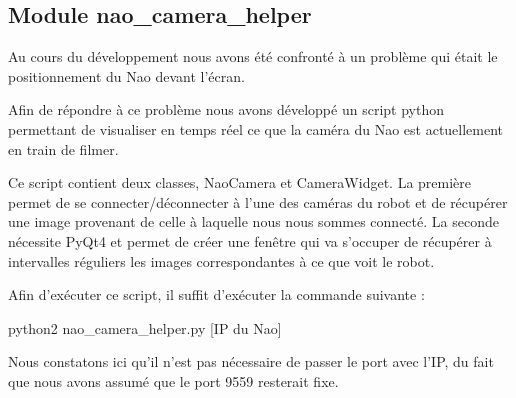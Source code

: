 \subsection{Module nao\_camera\_helper}
\label{sub:Module nao_camera_helper}
	\par Au cours du développement nous avons été confronté à un problème qui était
le positionnement du Nao devant l'écran.
	\par Afin de répondre à ce problème nous avons développé un
script python permettant de visualiser en temps réel ce que la caméra du Nao est
actuellement en train de filmer.
	\par Ce script contient deux classes, NaoCamera et CameraWidget. La première
permet de se connecter/déconnecter à l'une des caméras du robot et de récupérer
une image provenant de celle à laquelle nous nous sommes connecté. La seconde
nécessite PyQt4 et permet de créer une fenêtre qui va s'occuper de récupérer à
intervalles réguliers les images correspondantes à ce que voit le robot.
	\par Afin d'exécuter ce script, il suffit d'exécuter la commande suivante :
	\begin{center}
		{python2 nao\_camera\_helper.py [IP du Nao]}
	\end{center}
	\par Nous constatons ici qu'il n'est pas nécessaire de passer le port avec l'IP,
du fait que nous avons assumé que le port 9559 resterait fixe.
